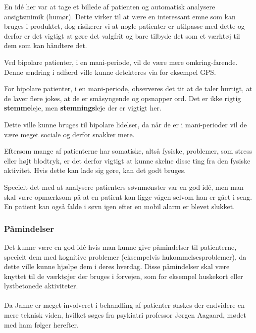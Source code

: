 \begin{description}[style=nextline]
\item[Billedanalyse]
En idé her var at tage et billede af patienten og automatisk analysere ansigtsmimik (humør).
Dette virker til at være en interessant emne som kan bruges i produktet, dog risikerer vi at nogle patienter er utilpasse med dette og derfor er det vigtigt at gøre det valgfrit og bare tilbyde det som et værktøj til dem som kan håndtere det.


\item[Placering]
Ved bipolare patienter, i en mani-periode, vil de være mere omkring-farende.
Denne ændring i adfærd ville kunne detekteres via for eksempel GPS.

\item[Lyd] 
For bipolare patienter, i en mani-periode, observeres det tit at de taler hurtigt, at de laver flere jokes, at de er småsyngende og opsnapper ord. Det er ikke rigtig \textbf{stemme}leje, men \textbf{stemnings}leje der er vigtigt her.

\item[Opkald]
Dette ville kunne bruges til bipolare lidelser, da når de er i mani-perioder vil de være meget sociale og derfor snakker mere. 

\item[Puls]
Eftersom mange af patienterne har somatiske, altså fysiske, problemer, som stress eller højt blodtryk, er det derfor vigtigt at kunne skelne disse ting fra den fysiske aktivitet.
Hvis dette kan lade sig gøre, kan det godt bruges.

\item[Søvn]
Specielt det med at analysere patienters søvnmønster var en god idé, men man skal være opmærksom på at en patient kan ligge vågen selvom han er gået i seng. 
En patient kan også falde i søvn igen efter en mobil alarm er blevet slukket.
\end{description}

\subsubsection{Påmindelser}
Det kunne være en god idé hvis man kunne give påmindelser til patienterne, specielt dem med kognitive problemer (eksempelvis hukommelsesproblemer), da dette ville kunne hjælpe dem i deres hverdag.
Disse påmindelser skal være knyttet til de værktøjer der bruges i forvejen, som for eksempel huskekort eller lystbetonede aktiviteter.

\paragraph{}
Da Janne er meget involveret i behandling af patienter ønskes der endvidere en mere teknisk viden, hvilket søges fra psykiatri professor Jørgen Aagaard, mødet med ham følger herefter.